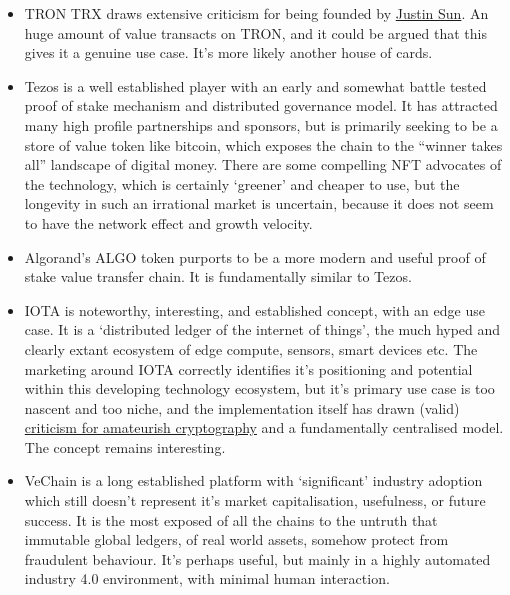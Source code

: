 \begin{itemize}
\item TRON TRX draws extensive criticism for being founded by \href{https://www.theverge.com/c/22947663/justin-sun-tron-cryptocurrency-poloniex}{Justin Sun}. An huge amount of value transacts on TRON, and it could be argued that this gives it a genuine use case. It's more likely another house of cards.
\item Tezos is a well established player with an early and somewhat battle tested proof of stake mechanism and distributed governance model. It has attracted many high profile partnerships and sponsors, but is primarily seeking to be a store of value token like bitcoin, which exposes the chain to the ``winner takes all'' landscape of digital money. There are some compelling NFT advocates of the technology, which is certainly `greener' and cheaper to use, but the longevity in such an irrational market is uncertain, because it does not seem to have the network effect and growth velocity. 
\item Algorand's ALGO token purports to be a more modern and useful proof of stake value transfer chain. It is fundamentally similar to Tezos.
\item IOTA is noteworthy, interesting, and established concept, with an edge use case. It is a `distributed ledger of the internet of things', the much hyped and clearly extant ecosystem of edge compute, sensors, smart devices etc. The marketing around IOTA correctly identifies it's positioning and potential within this developing technology ecosystem, but it's primary use case is too nascent and too niche, and the implementation itself has drawn (valid) \href{https://medium.com/@neha/cryptographic-vulnerabilities-in-iota-9a6a9ddc4367}{criticism for amateurish cryptography} and a fundamentally centralised model. The concept remains interesting.
\item VeChain is a long established platform with `significant' industry adoption which still doesn't represent it's market capitalisation, usefulness, or future success. It is the most exposed of all the chains to the untruth that immutable global ledgers, of real world assets, somehow protect from fraudulent behaviour. It's perhaps useful, but mainly in a highly automated industry 4.0 environment, with minimal human interaction. 

\end{itemize}
